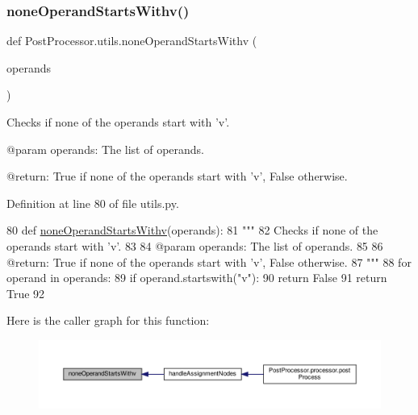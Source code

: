 \subsubsection{\texorpdfstring{none\+Operand\+Starts\+Withv()}{noneOperandStartsWithv()}}
{\footnotesize\ttfamily def Post\+Processor.\+utils.\+none\+Operand\+Starts\+Withv (\begin{DoxyParamCaption}\item[{}]{operands }\end{DoxyParamCaption})}

\begin{DoxyVerb}Checks if none of the operands start with 'v'.

@param operands: The list of operands.

@return: True if none of the operands start with 'v', False otherwise.
\end{DoxyVerb}
 

Definition at line 80 of file utils.\+py.


\begin{DoxyCode}
80 \textcolor{keyword}{def }\hyperlink{namespacePostProcessor_1_1utils_a379c264b5800e073d327d90d53cb854f}{noneOperandStartsWithv}(operands):
81     \textcolor{stringliteral}{"""
}
82 \textcolor{stringliteral}{    Checks if none of the operands start with 'v'.
}
83 \textcolor{stringliteral}{
}
84 \textcolor{stringliteral}{    @param operands: The list of operands.
}
85 \textcolor{stringliteral}{
}
86 \textcolor{stringliteral}{    @return: True if none of the operands start with 'v', False otherwise.
}
87 \textcolor{stringliteral}{    """}
88     \textcolor{keywordflow}{for} operand \textcolor{keywordflow}{in} operands:
89         \textcolor{keywordflow}{if} operand.startswith(\textcolor{stringliteral}{"v"}):
90             \textcolor{keywordflow}{return} \textcolor{keyword}{False}
91     \textcolor{keywordflow}{return} \textcolor{keyword}{True}
92 
\end{DoxyCode}
Here is the caller graph for this function\+:\nopagebreak
\begin{figure}[H]
\begin{center}
\leavevmode
\includegraphics[width=350pt]{namespacePostProcessor_1_1utils_a379c264b5800e073d327d90d53cb854f_icgraph}
\end{center}
\end{figure}
